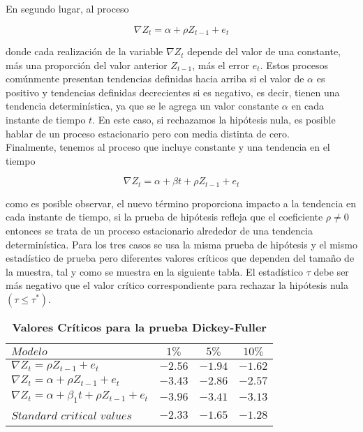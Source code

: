 En segundo lugar, al proceso

 \begin{equation}
 \nabla Z_t= \alpha +  \rho Z_{t-1}+e_t
 \end{equation}
 
donde cada realización de la variable $\nabla Z_t$ depende del valor de una constante, más una proporción del valor anterior $Z_{t-1}$, más el error $e_t$. Estos procesos comúnmente presentan tendencias definidas hacia arriba si el valor de $\alpha$ es positivo y tendencias definidas decrecientes si es negativo, es decir, tienen una tendencia determinística, ya que se le agrega un valor constante $\alpha$ en cada instante de tiempo $t$. En este caso, si rechazamos la hipótesis nula, es posible hablar de un proceso estacionario pero con media distinta de cero.\\

Finalmente, tenemos al proceso que incluye constante y una tendencia en el tiempo

 \begin{equation}
 \nabla Z_t= \alpha + \beta t + \rho Z_{t-1}+e_t
 \end{equation}
 
como es posible observar, el nuevo término proporciona impacto a la tendencia en cada instante de tiempo, si la prueba de hipótesis refleja que el coeficiente $\rho \neq 0$ entonces se trata de un proceso estacionario alrededor de una tendencia determinística. Para los tres casos se usa la misma prueba de hipótesis y  el mismo estadístico de prueba pero diferentes valores críticos que dependen del tamaño de la muestra, tal y como se muestra en la siguiente tabla. El estadístico $\tau$ debe ser más negativo que el valor crítico correspondiente para rechazar la hipótesis nula $(\tau \leq \tau^*)$.\\


\begin{table}[ht]
\caption{\textbf{Valores Críticos para la prueba Dickey-Fuller}}
\centering
   \begin{tabular}{lccc}
    $Modelo$                                               &  $1\%$    &  $5\%$    & $10\%$   \\
    \hline
    $\nabla Z_t =\rho Z_{t-1} + e_t$                     &  $-2.56$ & $-1.94$ & $-1.62$ \\
    $\nabla Z_t = \alpha + \rho Z_{t-1} + e_t$            &  $-3.43$ & $-2.86$ & $-2.57$ \\
    $\nabla Z_t = \alpha + \beta_1 t + \rho Z_{t-1} + e_t$ & $-3.96$ & $-3.41$ & $-3.13$ \\
    \hline
    $Standard$  $critical$ $values$                         & $-2.33$ & $-1.65$ & $-1.28$ \\
    \hline
    \end{tabular}
\label{table:CVDF}
\end{table}


